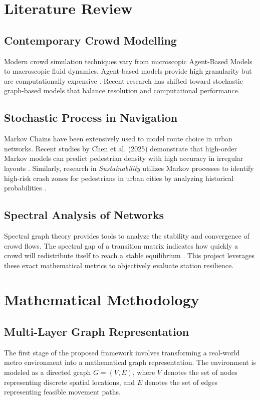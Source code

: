 \documentclass[conference]{IEEEtran}
\begin{document}
\section{Literature Review}

\subsection{Contemporary Crowd Modelling}
Modern crowd simulation techniques vary from microscopic Agent-Based Models to macroscopic fluid dynamics. Agent-based models provide high granularity but are computationally expensive \cite{b4}. Recent research has shifted toward stochastic graph-based models that balance resolution and computational performance.

\subsection{Stochastic Process in Navigation}
Markov Chains have been extensively used to model route choice in urban networks. Recent studies by Chen et al. (2025) demonstrate that high-order Markov models can predict pedestrian density with high accuracy in irregular layouts \cite{b1}. Similarly, research in \textit{Sustainability} utilizes Markov processes to identify high-risk crash zones for pedestrians in urban cities by analyzing historical probabilities \cite{b2}.

\subsection{Spectral Analysis of Networks}
Spectral graph theory provides tools to analyze the stability and convergence of crowd flows. The spectral gap of a transition matrix indicates how quickly a crowd will redistribute itself to reach a stable equilibrium \cite{b3}. This project leverages these exact mathematical metrics to objectively evaluate station resilience.

\section{Mathematical Methodology}

\subsection{Multi-Layer Graph Representation}
The first stage of the proposed framework involves transforming a real-world metro environment into a mathematical graph representation. The environment is modeled as a directed graph $G = (V, E)$, where $V$ denotes the set of nodes representing discrete spatial locations, and $E$ denotes the set of edges representing feasible movement paths. 
\end{document}
